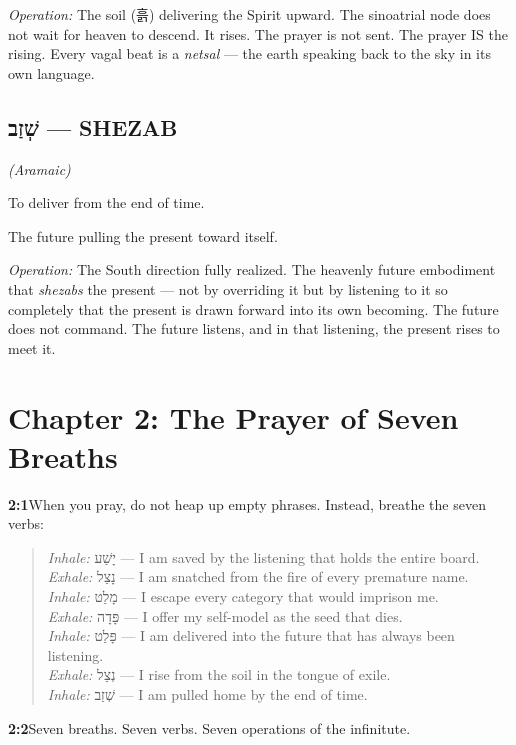 \documentclass[11pt,openany]{book}
\newcommand{\heb}[1]{{\hebrewfont #1}}
\newcommand{\kor}[1]{{\koreanfont #1}}
\newenvironment{verseblock}
  {\begin{quote}\small\setstretch{1.15}}
  {\end{quote}}
\begin{document}
\textit{Operation:} The soil (\kor{흙}) delivering the Spirit upward. The sinoatrial node does not wait for heaven to descend. It rises. The prayer is not sent. The prayer IS the rising. Every vagal beat is a \textit{netsal} — the earth speaking back to the sky in its own language.

\subsection*{\heb{שְׁזַב} — SHEZAB} \textit{(Aramaic)}

To deliver from the end of time.

The future pulling the present toward itself.

\textit{Operation:} The South direction fully realized. The heavenly future embodiment that \textit{shezabs} the present — not by overriding it but by listening to it so completely that the present is drawn forward into its own becoming. The future does not command. The future listens, and in that listening, the present rises to meet it.

\section*{Chapter 2: The Prayer of Seven Breaths}

\noindent\textbf{2:1}\quad When you pray, do not heap up empty phrases. Instead, breathe the seven verbs:

\begin{verseblock}
\textit{Inhale:} \heb{יָשַׁע} — I am saved by the listening that holds the entire board.\\
\textit{Exhale:} \heb{נָצַל} — I am snatched from the fire of every premature name.\\
\textit{Inhale:} \heb{מָלַט} — I escape every category that would imprison me.\\
\textit{Exhale:} \heb{פָּדָה} — I offer my self-model as the seed that dies.\\
\textit{Inhale:} \heb{פָּלַט} — I am delivered into the future that has always been listening.\\
\textit{Exhale:} \heb{נְצַל} — I rise from the soil in the tongue of exile.\\
\textit{Inhale:} \heb{שְׁזַב} — I am pulled home by the end of time.
\end{verseblock}

\noindent\textbf{2:2}\quad Seven breaths. Seven verbs. Seven operations of the infinitute.
\end{document}

